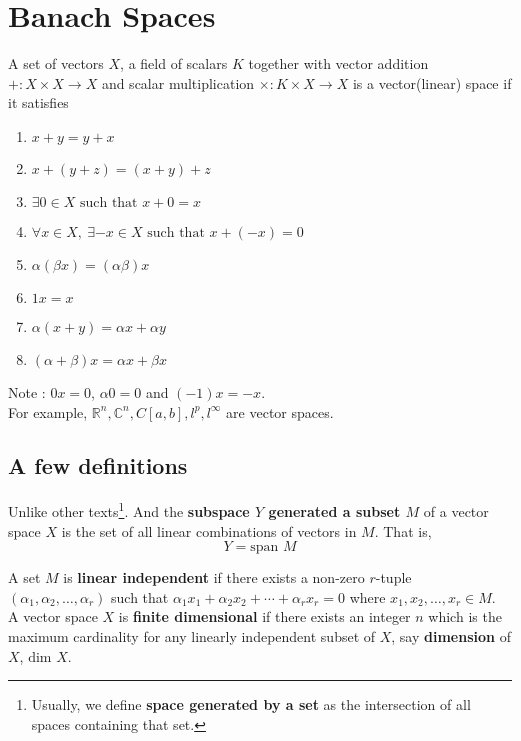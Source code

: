 \section{Banach Spaces}
\begin{definition}
	A set of vectors $X$, a field of scalars $K$ together with vector addition $+ : X \times X \to X$ and scalar multiplication $\times : K \times X \to X$ is a vector(linear) space if it satisfies
	\begin{enumerate}
		\item $x+y = y+x$
		\item $x+(y+z) = (x+y)+z$
		\item $\exists 0 \in X \text{ such that } x+0=x$
		\item $\forall x \in X,\ \exists -x \in X \text{ such that } x+(-x) = 0$
		\item $\alpha (\beta x) = (\alpha\beta)x$
		\item $1x = x$
		\item $\alpha(x+y) = \alpha x + \alpha y$
		\item $(\alpha+\beta)x = \alpha x + \beta x$
	\end{enumerate}
\end{definition}

Note : $0x = 0$, $\alpha 0 = 0$ and $(-1)x = -x$.\\

For example, $\mathbb{R}^n, \mathbb{C}^n, C[a,b], l^p, l^\infty$ are vector spaces.

\subsection{A few definitions}
Unlike other texts\dag\footnote{
	Usually, we define \textbf{space generated by a set} as the intersection of all spaces containing that set.}.
	And the \textbf{subspace $Y$ generated a subset $M$} of a vector space $X$ is the set of all linear combinations of vectors in $M$.
	That is,
	\[ Y = \text{span } M \]

A set $M$ is \textbf{linear independent} if there exists a non-zero $r$-tuple $(\alpha_1,\alpha_2,\dots,\alpha_r)$ such that $\alpha_1 x_1 + \alpha_2 x_2 + \dotsb + \alpha_r x_r = 0$ where $x_1,x_2,\dots,x_r \in M$.\\

A vector space $X$ is \textbf{finite dimensional} if there exists an integer $n$ which is the maximum cardinality for any linearly independent subset of $X$, say \textbf{dimension} of $X$, $\text{dim } X$.\\

